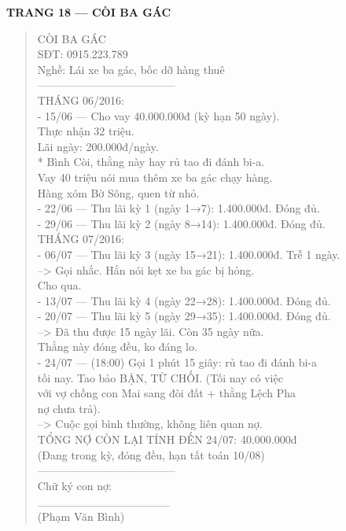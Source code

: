 \documentclass[12pt,a4paper]{article}
\begin{document}
\vspace{0.35cm}\noindent\textbf{\large TRANG 18 — CÒI BA GÁC}\\[0.15cm]



\begin{quote}
\fontsize{9pt}{11pt}\selectfont\ttfamily
CÒI BA GÁC\\
SĐT: 0915.223.789\\
Nghề: Lái xe ba gác, bốc dỡ hàng thuê\\
--------------------------------------\\
\vspace{0.2cm}
THÁNG 06/2016:\\
- 15/06 --- Cho vay 40.000.000đ (kỳ hạn 50 ngày).\\
          Thực nhận 32 triệu.\\
          Lãi ngày: 200.000đ/ngày.\\
          * Bình Còi, thằng này hay rủ tao đi đánh bi-a.\\
            Vay 40 triệu nói mua thêm xe ba gác chạy hàng.\\
            Hàng xóm Bờ Sông, quen từ nhỏ.\\
\vspace{0.2cm}
- 22/06 --- Thu lãi kỳ 1 (ngày 1→7): 1.400.000đ. Đóng đủ.\\
- 29/06 --- Thu lãi kỳ 2 (ngày 8→14): 1.400.000đ. Đóng đủ.\\
\vspace{0.2cm}
THÁNG 07/2016:\\
- 06/07 --- Thu lãi kỳ 3 (ngày 15→21): 1.400.000đ. Trễ 1 ngày.\\
          --> Gọi nhắc. Hắn nói kẹt xe ba gác bị hỏng.\\
              Cho qua.\\
- 13/07 --- Thu lãi kỳ 4 (ngày 22→28): 1.400.000đ. Đóng đủ.\\
- 20/07 --- Thu lãi kỳ 5 (ngày 29→35): 1.400.000đ. Đóng đủ.\\
          --> Đã thu được 15 ngày lãi. Còn 35 ngày nữa.\\
              Thằng này đóng đều, ko đáng lo.\\
- 24/07 --- (18:00) Gọi 1 phút 15 giây: rủ tao đi đánh bi-a\\
          tối nay. Tao bảo BẬN, TỪ CHỐI. (Tối nay có việc\\
          với vợ chồng con Mai sang đòi đất + thằng Lệch Pha\\
          nợ chưa trả).\\
          --> Cuộc gọi bình thường, không liên quan nợ.\\
\vspace{0.2cm}
TỔNG NỢ CÒN LẠI TÍNH ĐẾN 24/07: 40.000.000đ\\
(Đang trong kỳ, đóng đều, hạn tất toán 10/08)\\
--------------------------------------\\
Chữ ký con nợ:\\
\vspace{0.2cm}
\_\_\_\_\_\_\_\_\_\_\_\_\_\_\_\_\\
(Phạm Văn Bình)\\
\end{quote}
\end{document}
